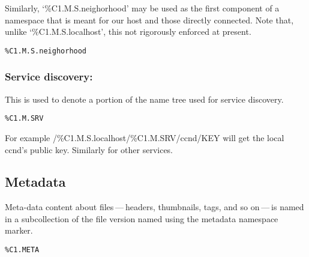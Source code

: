  Similarly, ‘\%C1.M.S.neighorhood’ may be used as the first component of a namespace that is meant for our host and those directly connected. Note that, unlike ‘\%C1.M.S.localhost’, this not rigorously enforced at present.
\begin{verbatim}
%C1.M.S.neighorhood
\end{verbatim}
\subsubsection*{Service discovery:}


 This is used to denote a portion of the name tree used for service discovery.
\begin{verbatim}
%C1.M.SRV
\end{verbatim}


 For example /\%C1.M.S.localhost/\%C1.M.SRV/ccnd/KEY will get the local ccnd’s public key. Similarly for other services.
\subsection*{Metadata}


 Meta-data content about files — headers, thumbnails, tags, and so on — is named in a subcollection of the file version named using the metadata namespace marker.
\begin{verbatim}
%C1.META
\end{verbatim}

